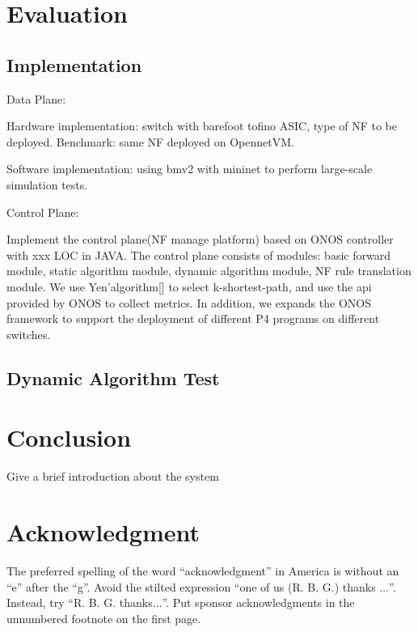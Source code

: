 \documentclass[10pt, conference, letterpaper]{IEEEtran}
\begin{document}
\section{Evaluation}
\subsection{Implementation}
Data Plane:

Hardware implementation: switch with barefoot tofino ASIC, type of NF to be deployed.
Benchmark: same NF deployed on OpennetVM.

Software implementation: using bmv2 with mininet to perform large-scale simulation tests.

Control Plane:

Implement the control plane(NF manage platform) based on ONOS controller with xxx LOC in JAVA. The control plane consists of modules: basic forward module, static algorithm module, dynamic algorithm module, NF rule translation module. We use Yen'algorithm[] to select k-shortest-path, and use the api provided by ONOS to collect metrics. In addition, we expands the ONOS framework to support the deployment of different P4 programs on different switches.


\subsection{Dynamic Algorithm Test}



\section{Conclusion}
Give a brief introduction about the system
~\\



\section*{Acknowledgment}

The preferred spelling of the word ``acknowledgment'' in America is without 
an ``e'' after the ``g''. Avoid the stilted expression ``one of us (R. B. 
G.) thanks $\ldots$''. Instead, try ``R. B. G. thanks$\ldots$''. Put sponsor 
acknowledgments in the unnumbered footnote on the first page.

  

\cite{Bianchi2014}
\cite{Sun2017}
\cite{Li2016}
\cite{Pontarelli2019}
\cite{Dargahi2017}
\cite{Gember-Jacobson2015}
\cite{Sun2017}
\cite{sun2017hyper}
\cite{bosshart2014p4}
\cite{fujisawa2002sdpa}
\cite{sun2017hyper}
\cite{xu2016demystifying}
\cite{bifulco2018survey}
\cite{zheng2018p4visor}
\cite{zhang2019hypervdp}
\cite{hancock2016hyper4}
\end{document}
